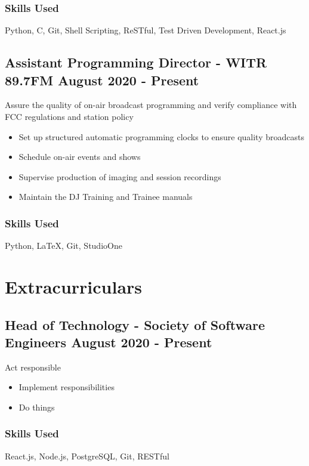 \documentclass[11pt, letterpaper]{article}
\begin{document}
            \subsubsection{Skills Used}
                Python, C, Git, Shell Scripting, ReSTful, Test Driven Development, React.js
        \subsection{Assistant Programming Director - WITR 89.7FM \hfill August 2020 - Present}
            Assure the quality of on-air broadcast programming and verify compliance with FCC
            regulations and station policy
            \begin{itemize}[nosep]
                \item Set up structured automatic programming clocks to ensure quality broadcasts
                \item Schedule on-air events and shows
                \item Supervise production of imaging and session recordings
                \item Maintain the DJ Training and Trainee manuals
            \end{itemize}
            \subsubsection{Skills Used}
                Python, LaTeX, Git, StudioOne

    \section{Extracurriculars}
        \subsection{Head of Technology - Society of Software Engineers \hfill August 2020 - Present}
            Act responsible 
            \begin{itemize}[nosep]
                \item Implement responsibilities
                \item Do things
            \end{itemize}
            \subsubsection{Skills Used}
                React.js, Node.js, PostgreSQL, Git, RESTful
\end{document}
